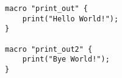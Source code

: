 \begin{lstlisting}
macro "print_out" {
	print("Hello World!");
}

macro "print_out2" {
	print("Bye World!");
}


\end{lstlisting}